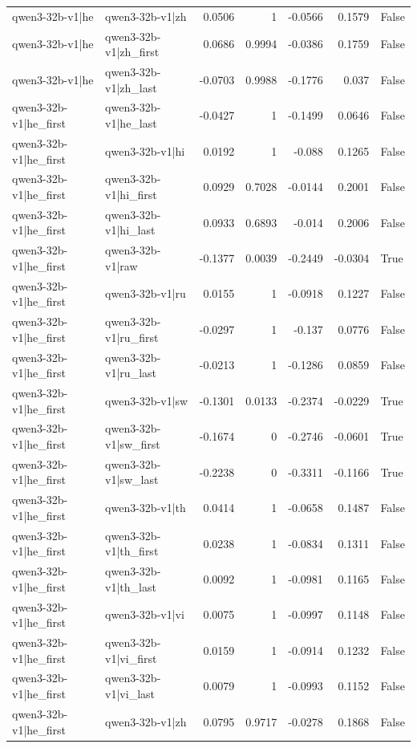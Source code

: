 \begin{table}
\begin{tabular}{l l r r r r l}
qwen3-32b-v1|he & qwen3-32b-v1|zh & 0.0506 & 1 & -0.0566 & 0.1579 & False \\
qwen3-32b-v1|he & qwen3-32b-v1|zh_first & 0.0686 & 0.9994 & -0.0386 & 0.1759 & False \\
qwen3-32b-v1|he & qwen3-32b-v1|zh_last & -0.0703 & 0.9988 & -0.1776 & 0.037 & False \\
qwen3-32b-v1|he_first & qwen3-32b-v1|he_last & -0.0427 & 1 & -0.1499 & 0.0646 & False \\
qwen3-32b-v1|he_first & qwen3-32b-v1|hi & 0.0192 & 1 & -0.088 & 0.1265 & False \\
qwen3-32b-v1|he_first & qwen3-32b-v1|hi_first & 0.0929 & 0.7028 & -0.0144 & 0.2001 & False \\
qwen3-32b-v1|he_first & qwen3-32b-v1|hi_last & 0.0933 & 0.6893 & -0.014 & 0.2006 & False \\
qwen3-32b-v1|he_first & qwen3-32b-v1|raw & -0.1377 & 0.0039 & -0.2449 & -0.0304 & True \\
qwen3-32b-v1|he_first & qwen3-32b-v1|ru & 0.0155 & 1 & -0.0918 & 0.1227 & False \\
qwen3-32b-v1|he_first & qwen3-32b-v1|ru_first & -0.0297 & 1 & -0.137 & 0.0776 & False \\
qwen3-32b-v1|he_first & qwen3-32b-v1|ru_last & -0.0213 & 1 & -0.1286 & 0.0859 & False \\
qwen3-32b-v1|he_first & qwen3-32b-v1|sw & -0.1301 & 0.0133 & -0.2374 & -0.0229 & True \\
qwen3-32b-v1|he_first & qwen3-32b-v1|sw_first & -0.1674 & 0 & -0.2746 & -0.0601 & True \\
qwen3-32b-v1|he_first & qwen3-32b-v1|sw_last & -0.2238 & 0 & -0.3311 & -0.1166 & True \\
qwen3-32b-v1|he_first & qwen3-32b-v1|th & 0.0414 & 1 & -0.0658 & 0.1487 & False \\
qwen3-32b-v1|he_first & qwen3-32b-v1|th_first & 0.0238 & 1 & -0.0834 & 0.1311 & False \\
qwen3-32b-v1|he_first & qwen3-32b-v1|th_last & 0.0092 & 1 & -0.0981 & 0.1165 & False \\
qwen3-32b-v1|he_first & qwen3-32b-v1|vi & 0.0075 & 1 & -0.0997 & 0.1148 & False \\
qwen3-32b-v1|he_first & qwen3-32b-v1|vi_first & 0.0159 & 1 & -0.0914 & 0.1232 & False \\
qwen3-32b-v1|he_first & qwen3-32b-v1|vi_last & 0.0079 & 1 & -0.0993 & 0.1152 & False \\
qwen3-32b-v1|he_first & qwen3-32b-v1|zh & 0.0795 & 0.9717 & -0.0278 & 0.1868 & False \\

\end{tabular}
\end{table}
